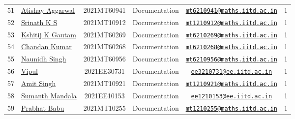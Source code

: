 \documentclass[table]{rapportCS}
\begin{document}
\begin{table}
\begin{tabular}{|p{.3cm}|p{3cm}|c|p{2.7cm}|c|c|}
51 & \href{www.linkedin.com/in/atishay-aggarwal-066414226}{Atishay
Aggarwal} & 2021MT60941 & Documentation  &
\href{mailto:mt6210941@maths.iitd.ac.in}{\nolinkurl{mt6210941@maths.iitd.ac.in}}
& 1 \\
52 & \href{https://www.linkedin.com/in/srinath-k-s-875834222/}{Srinath K
S} & 2021MT10912 & Documentation  &
\href{mailto:mt1210912@maths.iitd.ac.in}{\nolinkurl{mt1210912@maths.iitd.ac.in}}
& 1 \\
53 & \href{https://www.linkedin.com/in/kshitij-kumar-gautam/}{Kshitij K
Gautam} & 2021MT60269 & Documentation  &
\href{mailto:mt6210269@maths.iitd.ac.in}{\nolinkurl{mt6210269@maths.iitd.ac.in}}
& 1 \\
54 & \href{https://www.linkedin.com/in/chandan-kumar-774813224}{Chandan
Kumar} & 2021MT60268 & Documentation  &
\href{mailto:mt6210268@maths.iitd.ac.in}{\nolinkurl{mt6210268@maths.iitd.ac.in}}
& 1 \\
55 & \href{https://www.linkedin.com/in/naunidh-singh-0b256a22b/}{Naunidh
Singh} & 2021MT60956 & Documentation  &
\href{mailto:mt6210956@maths.iitd.ac.in}{\nolinkurl{mt6210956@maths.iitd.ac.in}}
& 1 \\
56 & \href{www.linkedin.com/in/vipul-yadav-6142a6287}{Vipul} &
2021EE30731 & Documentation  &
\href{mailto:ee3210731@ee.iitd.ac.in}{\nolinkurl{ee3210731@ee.iitd.ac.in}}
& 1 \\
57 & \href{https://www.linkedin.com/in/amit-singh-221888236/}{Amit
Singh} & 2021MT10921 & Documentation  &
\href{mailto:mt1210921@maths.iitd.ac.in}{\nolinkurl{mt1210921@maths.iitd.ac.in}}
& 1 \\
58 &
\href{https://www.linkedin.com/in/sumanth-mandala-868a1a2aa/}{Sumanth
Mandala} & 2021EE10153 & Documentation  &
\href{mailto:ee1210153@ee.iitd.ac.in}{\nolinkurl{ee1210153@ee.iitd.ac.in}}
& 1 \\
59 & \href{https://www.linkedin.com/in/prabhat-babu-490096282}{Prabhat
Babu} & 2021MT10255 & Documentation  &
\href{mailto:mt1210255@maths.iitd.ac.in}{\nolinkurl{mt1210255@maths.iitd.ac.in}}
& 1 \\

\hline
\end{tabular}

\end{table}
\end{document}
